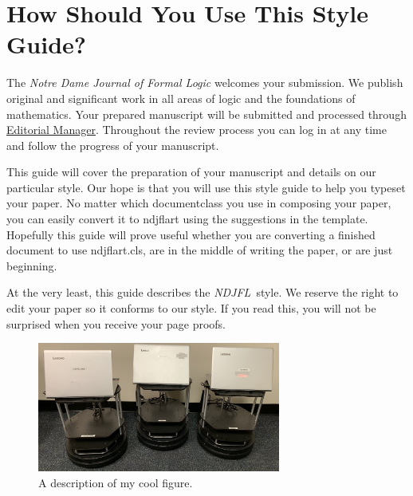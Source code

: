 \documentclass{ndjflart}
\theoremstyle{definition}
\theoremstyle{remark}
\newcommand{\NDJFL}{\emph{NDJFL}}
\begin{document}
\begin{frontmatter}
\begin{keyword}[class=AMS]
    
\end{keyword}

\begin{keyword}
   
\end{keyword}

\end{frontmatter}


\section{How Should You Use This Style Guide?}\label{intro}
The \emph{Notre Dame Journal of Formal Logic} welcomes your
submission.  We publish original and significant work in all areas of
logic and the foundations of mathematics.  Your prepared manuscript
will be submitted and processed through
\href{http://www.editorialmanager.com/ndjfl}{Editorial Manager}.
Throughout the review process you can log in at any time and follow
the progress of your manuscript.

This guide will cover the preparation of your manuscript and details
on our particular style.  Our hope is that you will use this style
guide to help you typeset your paper.  No matter which documentclass
you use in composing your paper, you can easily convert it to ndjflart
using the suggestions in the template.  Hopefully this guide will
prove useful whether you are converting a finished document to use
ndjflart.cls, are in the middle of writing the paper, or are just
beginning.

At the very least, this guide describes the \NDJFL\ style. We reserve
the right to edit your paper so it conforms to our style. If you read
this, you will not be surprised when you receive your page proofs.


\begin{figure}
\begin{center}
\vspace{0.5em}
    \includegraphics[width=8cm]{images/turtlebots}
    \vspace{-.5em}
\caption{A description of my cool figure. }
\label{fig:framework}
    \end{center}
\end{figure}
\end{document}
